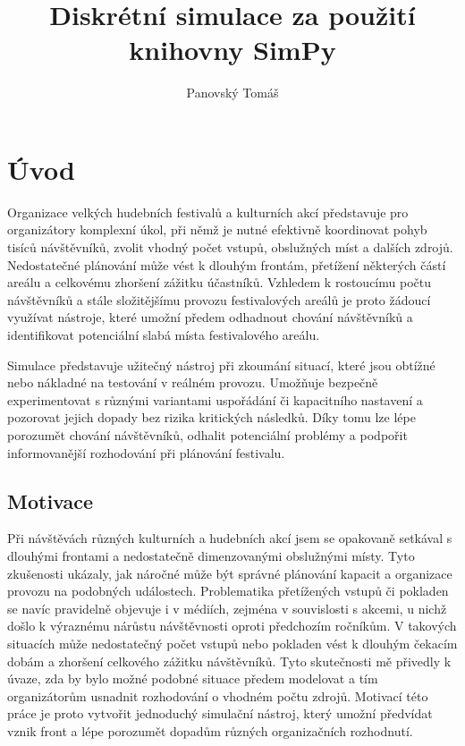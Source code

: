 \documentclass[
  program=itp,
  biblatex,
  figures=false,
  glossaries,
  index
]{kidiplom}
\title{Diskrétní simulace za použití knihovny SimPy}
\author{Panovský Tomáš}
\begin{document}
\maketitle


\section{Úvod}
Organizace velkých hudebních festivalů a kulturních akcí představuje pro organizátory komplexní úkol, při němž je nutné efektivně koordinovat pohyb tisíců návštěvníků, zvolit vhodný počet vstupů, obslužných míst a dalších zdrojů. Nedostatečné plánování může vést k dlouhým frontám, přetížení některých částí areálu a celkovému zhoršení zážitku účastníků. Vzhledem k rostoucímu počtu návštěvníků a stále složitějšímu provozu festivalových areálů je proto žádoucí využívat nástroje, které umožní předem odhadnout chování návštěvníků a identifikovat potenciální slabá místa festivalového areálu.

Simulace představuje užitečný nástroj při zkoumání situací, které jsou obtížné nebo nákladné na testování v reálném provozu. Umožňuje bezpečně experimentovat s různými variantami uspořádání či kapacitního nastavení a pozorovat jejich dopady bez rizika kritických následků. Díky tomu lze lépe porozumět chování návštěvníků, odhalit potenciální problémy a podpořit informovanější rozhodování při plánování festivalu.

 
\subsection{Motivace}
Při návštěvách různých kulturních a hudebních akcí jsem se opakovaně setkával s dlouhými frontami a nedostatečně dimenzovanými obslužnými místy. Tyto zkušenosti ukázaly, jak náročné může být správné plánování kapacit a organizace provozu na podobných událostech. Problematika přetížených vstupů či pokladen se navíc pravidelně objevuje i v médiích, zejména v souvislosti s akcemi, u nichž došlo k výraznému nárůstu návštěvnosti oproti předchozím ročníkům. V takových situacích může nedostatečný počet vstupů nebo pokladen vést k dlouhým čekacím dobám a zhoršení celkového zážitku návštěvníků. Tyto skutečnosti mě přivedly k úvaze, zda by bylo možné podobné situace předem modelovat a tím organizátorům usnadnit rozhodování o vhodném počtu zdrojů. Motivací této práce je proto vytvořit jednoduchý simulační nástroj, který umožní předvídat vznik front a lépe porozumět dopadům různých organizačních rozhodnutí.
\end{document}
